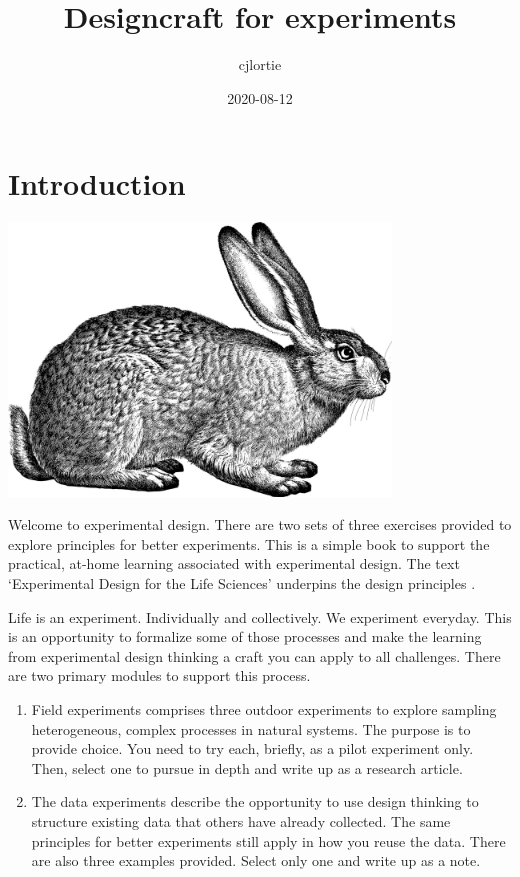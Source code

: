 \documentclass[
]{book}
\title{Designcraft for experiments}
\author{cjlortie}
\date{2020-08-12}
\begin{document}
\maketitle

{
\setcounter{tocdepth}{1}
\tableofcontents
}
\hypertarget{introduction}{%
\chapter{Introduction}\label{introduction}}

\includegraphics[width=4in,height=\textheight]{./rabbit.png}

Welcome to experimental design. There are two sets of three exercises provided to explore principles for better experiments. This is a simple book to support the practical, at-home learning associated with experimental design. The text `Experimental Design for the Life Sciences' underpins the design principles \citep{RN6381}.

Life is an experiment. Individually and collectively. We experiment everyday. This is an opportunity to formalize some of those processes and make the learning from experimental design thinking a craft you can apply to all challenges. There are two primary modules to support this process.

\begin{enumerate}
\def\labelenumi{(\arabic{enumi})}
\item
  Field experiments comprises three outdoor experiments to explore sampling heterogeneous, complex processes in natural systems. The purpose is to provide choice. You need to try each, briefly, as a pilot experiment only. Then, select one to pursue in depth and write up as a research article.
\item
  The data experiments describe the opportunity to use design thinking to structure existing data that others have already collected. The same principles for better experiments still apply in how you reuse the data. There are also three examples provided. Select only one and write up as a note.
\end{enumerate}
\end{document}
